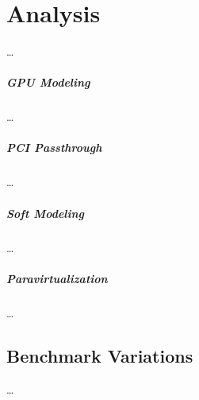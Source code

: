 

\chapter{Analysis}
\label{cha:analysis}
\ldots

\paragraph{GPU Modeling}
\label{par:analysis_gpumodeling}
\ldots

\paragraph{PCI Passthrough}
\label{par:analysis_pcipassthrough}
\ldots

\paragraph{Soft Modeling}
\label{par:analysis_softmodeling}
\ldots


\paragraph{Paravirtualization}
\label{par:analysis_paravirtualization}
\ldots



\section{Benchmark Variations}
\label{sec:analysis_benchmarkvariations}
\ldots

